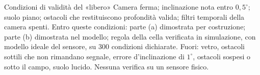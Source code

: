 \begin{riquadro}{Condizioni di validità del «libero»}
Camera ferma; inclinazione nota entro $0{,}5^\circ$; suolo piano; ostacoli che restituiscono profondità valida; filtri temporali della camera spenti. Entro queste condizioni: parte (a) dimostrata per costruzione; parte (b) dimostrata nel modello; regola della cella verificata in simulazione, con modello ideale del sensore, su 300 condizioni dichiarate. Fuori: vetro, ostacoli sottili che non rimandano segnale, errore d'inclinazione di $1^\circ$, ostacoli sospesi o sotto il campo, suolo lucido. Nessuna verifica su un sensore fisico.
\end{riquadro}
